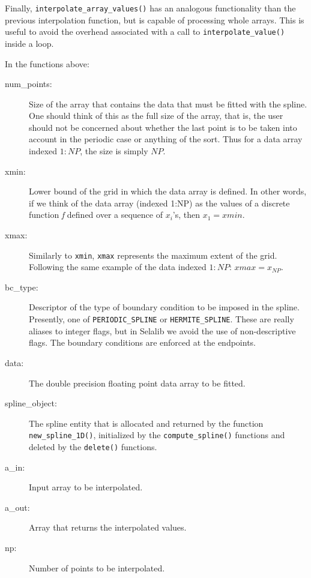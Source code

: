 \documentclass[]{report}   %
\begin{document}
Finally, \verb+interpolate_array_values()+ has an analogous functionality than the previous interpolation function, but is capable of processing whole arrays. This is useful to avoid the overhead associated with a call to \verb+interpolate_value()+ inside a loop.

In the functions above:
\begin{description}
\item[num\_points:] 
Size of the array that contains the data that must be fitted with the spline. One should think of this as the full size of the array, that is, the user should not be concerned about whether the last point is to be taken into account in the periodic case or anything of the sort. Thus for a data array indexed $1:NP$, the size is simply $NP$.
\item[xmin:]
Lower bound of the grid in which the data array is defined. In other words, if we think of the data array (indexed 1:NP) as the values of a discrete function \emph{f} defined over a sequence of $x_i$'s, then $x_1 = xmin$.
\item[xmax:]
Similarly to \verb+xmin+, \verb+xmax+ represents the maximum extent of the grid. Following the same example of the data indexed $1:NP$: $xmax = x_{NP}$. 
\item[bc\_type:]
Descriptor of the type of boundary condition to be imposed in the spline. Presently, one of \verb+PERIODIC_SPLINE+ or \verb+HERMITE_SPLINE+. These are really aliases to integer flags, but in Selalib we avoid the use of non-descriptive flags. The boundary conditions are enforced at the endpoints.
\item[data:] 
The double precision floating point data array to be fitted.
\item[spline\_object:]
The spline entity that is allocated and returned by the function \verb+new_spline_1D()+, initialized by the \verb+compute_spline()+ functions and deleted by the \verb+delete()+ functions.
\item[a\_in:]
Input array to be interpolated.
\item[a\_out:]
Array that returns the interpolated values.
\item[np:] 
Number of points to be interpolated.
\end{description}
   
\end{document}
